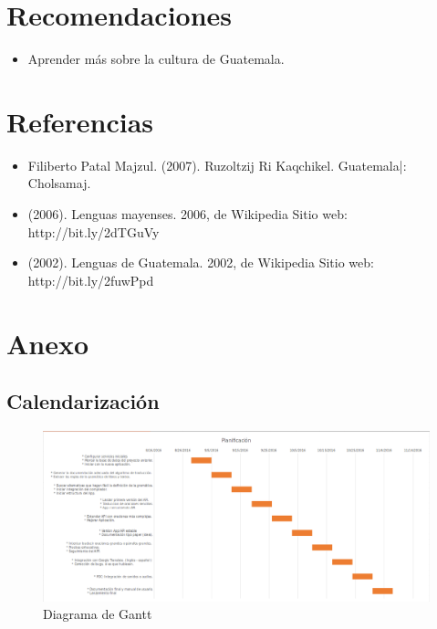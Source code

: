 \documentclass[a4paper,openright,11pt]{article}
\begin{document}
\section{Recomendaciones}
\begin{itemize}
	\item Aprender más sobre la cultura de Guatemala.
\end{itemize}
\newpage

\section{Referencias}
\begin{itemize}
	\item Filiberto Patal Majzul. (2007). Ruzoltzij Ri Kaqchikel. Guatemala|: Cholsamaj.
	\item (2006). Lenguas mayenses. 2006, de Wikipedia Sitio web: http://bit.ly/2dTGuVy
	\item (2002). Lenguas de Guatemala. 2002, de Wikipedia Sitio web: http://bit.ly/2fuwPpd
\end{itemize}
\newpage

\section{Anexo}
\subsection{Calendarización}
\begin{figure}[h]
  \centering
    \includegraphics[width=1.0\textwidth]{Gantt}
  \caption{Diagrama de Gantt}
  \label{fig:gantt}
\end{figure}
\end{document}
